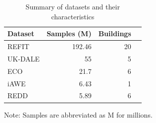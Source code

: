 
\begin{table}[H]
    \caption{Summary of datasets and their characteristics}
    \centering
    \begin{tabular}{lrrr}
        \toprule
        \textbf{Dataset} & \textbf{Samples (M)} & \textbf{Buildings} \\
        \midrule
        REFIT   &   192.46 & 20 \\
        UK-DALE &   55     &  5 \\
        ECO     &   21.7   &  6 \\
        iAWE    &   6.43   &  1 \\
        REDD    &   5.89   &  6 \\
        \bottomrule
    \end{tabular}
    \label{tab:dataset_analysis}
    \par\footnotesize{Note: Samples are abbreviated as M for millions.}
\end{table}

